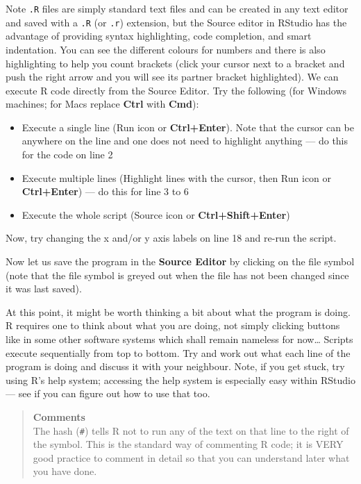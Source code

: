 \documentclass[
]{book}
\providecommand{\tightlist}{%
  \setlength{\itemsep}{0pt}\setlength{\parskip}{0pt}}
\begin{document}
Note \texttt{.R} files are simply standard text files and can be created in any text editor and saved with a \texttt{.R} (or \texttt{.r}) extension, but the Source editor in RStudio has the advantage of providing syntax highlighting, code completion, and smart indentation. You can see the different colours for numbers and there is also highlighting to help you count brackets (click your cursor next to a bracket and push the right arrow and you will see its partner bracket highlighted). We can execute R code directly from the Source Editor. Try the following (for Windows machines; for Macs replace \textbf{Ctrl} with \textbf{Cmd}):

\begin{itemize}
\tightlist
\item
  Execute a single line (Run icon or \textbf{Ctrl+Enter}). Note that the cursor can be anywhere on the line and one does not need to highlight anything --- do this for the code on line 2
\item
  Execute multiple lines (Highlight lines with the cursor, then Run icon or \textbf{Ctrl+Enter}) --- do this for line 3 to 6
\item
  Execute the whole script (Source icon or \textbf{Ctrl+Shift+Enter})
\end{itemize}

Now, try changing the x and/or y axis labels on line 18 and re-run the script.

Now let us save the program in the \textbf{Source Editor} by clicking on the file symbol (note that the file symbol is greyed out when the file has not been changed since it was last saved).

At this point, it might be worth thinking a bit about what the program is doing. R requires one to think about what you are doing, not simply clicking buttons like in some other software systems which shall remain nameless for now\ldots{} Scripts execute sequentially from top to bottom. Try and work out what each line of the program is doing and discuss it with your neighbour. Note, if you get stuck, try using R's help system; accessing the help system is especially easy within RStudio --- see if you can figure out how to use that too.

\begin{quote}
\textbf{Comments}\\
The hash (\texttt{\#}) tells R not to run any of the text on that line to the right of the symbol. This is the standard way of commenting R code; it is VERY good practice to comment in detail so that you can understand later what you have done.
\end{quote}
\end{document}
